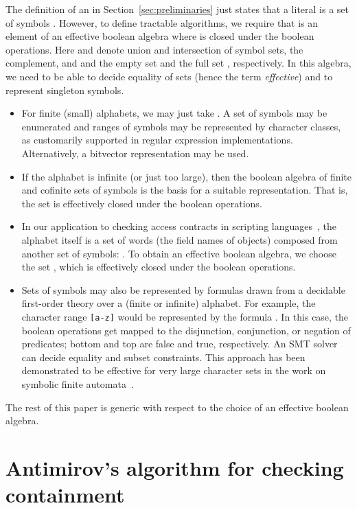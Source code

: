 The definition of an \ERE{} in Section~\ref{sec:preliminaries} just
states that a literal is a set of symbols
\mbox{}. However, to define tractable
algorithms, we require that  is an element of an
effective boolean algebra \cite{Veanes2013}  where  is closed under the boolean operations. Here
 and  denote 
union and intersection of symbol sets,  the complement,
and  and  the empty set and the full set ,
respectively. In this algebra, we need to be able to decide
equality of sets (hence the term \emph{effective}) and to represent
singleton symbols. 
\begin{itemize}
  \item For finite (small) alphabets, we may just take . A set of symbols may be enumerated
    and ranges of symbols may be represented by character classes, as
    customarily supported in regular expression
    implementations. Alternatively, a bitvector representation may be used.
  \item 
    If the alphabet is infinite (or just too large), then the boolean
    algebra of finite and cofinite sets of symbols is the basis for a
    suitable representation. That is, the set  is effectively closed under the boolean operations.
  \item
    In our application to checking access contracts in scripting
    languages~\cite{KeilThiemann2013-Proxy}, the alphabet itself is a set of words (the field names of
    objects) composed from another set  of symbols:
    . To obtain an
    effective boolean algebra, we choose the set ,
    which is effectively closed under the boolean operations.
  \item
    Sets of symbols may also be represented by formulas drawn from a
    decidable first-order theory over a (finite or infinite) alphabet.
    For example, the character range
    \texttt{[a-z]} would be represented by the formula . 
    In this case, the boolean operations get mapped to the disjunction,
    conjunction, or negation of predicates; bottom and top are false and true,
    respectively. An SMT solver can decide equality and subset constraints.
    This approach has been demonstrated to be
    effective for very large character sets in the work on symbolic finite
    automata~\cite{Veanes2013}.
\end{itemize}
The rest of this paper is generic with respect to the choice
of an effective boolean algebra. 



\section{Antimirov's algorithm for checking containment}
\label{sec:antimirovs-algorithm-containment}

